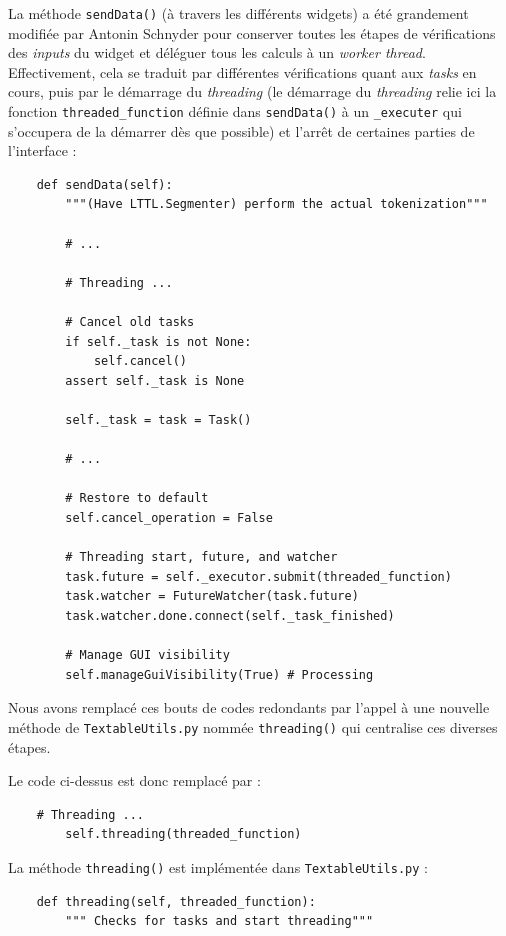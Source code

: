 \documentclass{article}
\begin{document}
{La méthode \texttt{sendData()} (à travers les différents widgets) a été grandement modifiée par Antonin Schnyder pour conserver toutes les étapes de vérifications des \textit{inputs} du widget et déléguer tous les calculs à un \textit{worker thread}. Effectivement, cela se traduit par différentes vérifications quant aux \textit{tasks} en cours, puis par le démarrage du \textit{threading} (le démarrage du \textit{threading} relie ici la fonction \texttt{threaded\_function} définie dans \texttt{sendData()} à un \texttt{\_executer} qui s'occupera de la démarrer dès que possible) et l'arrêt de certaines parties de l'interface : 

\begin{verbatim}
    def sendData(self):
        """(Have LTTL.Segmenter) perform the actual tokenization"""

        # ...

        # Threading ...
        
        # Cancel old tasks
        if self._task is not None:
            self.cancel()
        assert self._task is None

        self._task = task = Task()
        
        # ...

        # Restore to default
        self.cancel_operation = False

        # Threading start, future, and watcher
        task.future = self._executor.submit(threaded_function)
        task.watcher = FutureWatcher(task.future)
        task.watcher.done.connect(self._task_finished)

        # Manage GUI visibility
        self.manageGuiVisibility(True) # Processing
\end{verbatim}

Nous avons remplacé ces bouts de codes redondants par l'appel à une nouvelle méthode de \texttt{TextableUtils.py} nommée \texttt{threading()} qui centralise ces diverses étapes.

Le code ci-dessus est donc remplacé par : 

\begin{verbatim}
    # Threading ...
        self.threading(threaded_function)
\end{verbatim}

La méthode \texttt{threading()} est implémentée dans \texttt{TextableUtils.py} : 

\begin{verbatim}
    def threading(self, threaded_function):
        """ Checks for tasks and start threading"""


\end{verbatim}}
\end{document}
